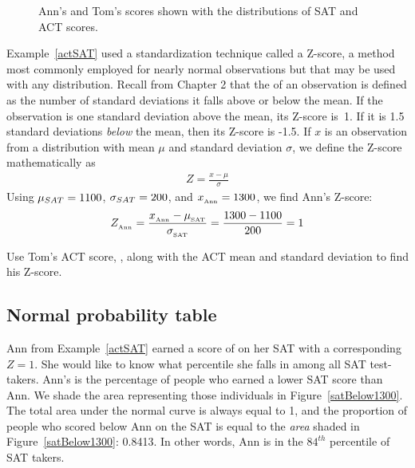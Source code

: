 \begin{figure}[h]
  \centering
  \caption{Ann's and Tom's scores shown with the distributions
      of SAT and ACT scores.}
  \label{satActNormals}
\end{figure}

Example~\ref{actSAT} used a standardization technique called
a Z-score, a method most commonly employed for nearly normal
observations but that may be used with any distribution.
Recall from Chapter 2 that the  of an observation is defined
as the number of standard deviations it falls above or below
the mean.
If the observation is one standard deviation above the mean,
its Z-score is~1.
If it is 1.5 standard deviations \emph{below} the mean,
then its Z-score is -1.5.
If $x$ is an observation from a distribution with mean $\mu$ and standard deviation $\sigma$,
we define the Z-score mathematically as
\begin{align*}
Z = \frac{x - \mu}{\sigma}
\end{align*}
Using $\mu_{SAT} = 1100{}$, $\sigma_{SAT} = 200{}$,
and $x_{_{\text{Ann}}} = 1300{}$, we find Ann's Z-score:
\begin{align*}
Z_{_{\text{Ann}}}
  = \frac{x_{_{\text{Ann}}} - \mu_{_{\text{SAT}}}}
      {\sigma_{_{\text{SAT}}}}
  = \frac{1300{} - 1100{}}{200{}}
  = 1{}
\end{align*}

\begin{exercisewrap}
\begin{nexercise}
Use Tom's ACT score, \tomsatscore{}, along with the ACT mean and
standard deviation to find his Z-score.\footnotemark{}
\end{nexercise}
\end{exercisewrap}

\subsection{Normal probability table}

\begin{examplewrap}
\begin{nexample}{Ann from Example~\ref{actSAT} earned a score of \annsatscore{} on her SAT with a corresponding $Z=1$. She would like to know what percentile she falls in among all SAT test-takers.}
Ann's  is the percentage of people who earned a lower SAT score than Ann. We shade the area representing those individuals in Figure~\ref{satBelow1300}. The total area under the normal curve is always equal to 1, and the proportion of people who scored below Ann on the SAT is equal to the \emph{area} shaded in Figure~\ref{satBelow1300}: 0.8413. In other words, Ann is in the $84^{th}$ percentile of SAT takers.
\end{nexample}
\end{examplewrap}

